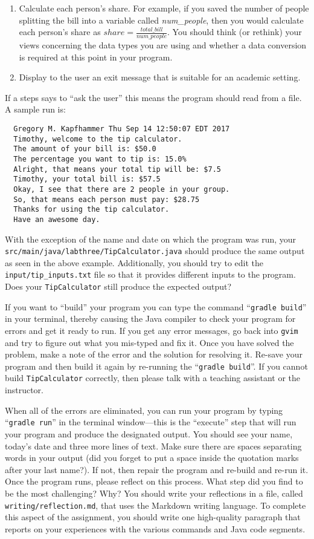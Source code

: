 \documentclass[11pt]{article}
\newcommand{\mainprogram}{\lstinline{TipCalculator}}
\newcommand{\mainprogramsource}{\lstinline{src/main/java/labthree/TipCalculator.java}}
\newcommand{\mainprograminput}{\lstinline{input/tip_inputs.txt}}
\newcommand{\reflection}{\lstinline{writing/reflection.md}}
\newcommand{\gradlebuild}{\command{gradle build}}
\newcommand{\gradlerun}{\command{gradle run}}
\newcommand{\command}[1]{``\lstinline{#1}''}
\newcommand{\program}[1]{\lstinline{#1}}
\newcommand{\step}[1]{``{#1}''}
\begin{document}
\begin{enumerate}
  \item Calculate each person's share. For example, if you saved the number of people splitting the bill into a variable
    called {\em num\_people}, then you would calculate each person's share as $share = \frac{total\_bill}{num\_people}$. You should think (or rethink) your views concerning the data types you are using and whether a data
    conversion is required at this point in your program.

  \item Display to the user an exit message that is suitable for an academic setting.

\end{enumerate}

\noindent If a steps says to ``ask the user'' this means the program should read from a file. A sample run is:

\begin{verbatim}
  Gregory M. Kapfhammer Thu Sep 14 12:50:07 EDT 2017
  Timothy, welcome to the tip calculator.
  The amount of your bill is: $50.0
  The percentage you want to tip is: 15.0%
  Alright, that means your total tip will be: $7.5
  Timothy, your total bill is: $57.5
  Okay, I see that there are 2 people in your group.
  So, that means each person must pay: $28.75
  Thanks for using the tip calculator.
  Have an awesome day.
\end{verbatim}

With the exception of the name and date on which the program was run, your \mainprogramsource{} should produce the same
output as seen in the above example. Additionally, you should try to edit the \mainprograminput{} file so that it
provides different inputs to the program. Does your \mainprogram{} still produce the expected output?

If you want to \step{build} your program you can type the command \gradlebuild{} in your terminal, thereby causing the
Java compiler to check your program for errors and get it ready to run. If you get any error messages, go back into
\program{gvim} and try to figure out what you mis-typed and fix it. Once you have solved the problem, make a note of the
error and the solution for resolving it. Re-save your program and then build it again by re-running the \gradlebuild{}.
If you cannot build \mainprogram{} correctly, then please talk with a teaching assistant or the instructor.

When all of the errors are eliminated, you can run your program by typing \gradlerun{} in the terminal window---this is
the ``execute'' step that will run your program and produce the designated output. You should see your name, today's
date and three more lines of text. Make sure there are spaces separating words in your output (did you forget to put a
space inside the quotation marks after your last name?). If not, then repair the program and re-build and re-run it.
Once the program runs, please reflect on this process. What step did you find to be the most challenging? Why? You
should write your reflections in a file, called \reflection{}, that uses the Markdown writing language. To complete this
aspect of the assignment, you should write one high-quality paragraph that reports on your experiences with the various
commands and Java code segments.
\end{document}
